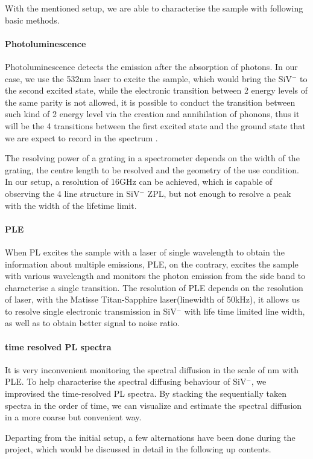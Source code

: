 With the mentioned setup, we are able to characterise the sample with following basic methods.


\paragraph{Photoluminescence} 
Photoluminescence detects the emission after the absorption of photons. In our case, we use the 532nm laser to excite the sample, which would bring the SiV$^{-}$ to the second excited state, while the electronic transition between 2 energy levels of the same parity is not allowed, it is possible to conduct the transition between such kind of 2 energy level via the creation and annihilation of phonons, thus it will be the 4 transitions between the first excited state and the ground state that we are expect to record in the spectrum .

The resolving power of a grating in a spectrometer depends on the width of the grating, the centre length to be resolved and the geometry of the use condition. In our setup, a resolution of 16GHz can be achieved, which is capable of observing the 4 line structure in SiV$^{-}$ ZPL, but not enough to resolve a peak with the width of the lifetime limit. 

\paragraph{PLE} When PL excites the sample with a laser of single wavelength to obtain the information about multiple emissions, PLE, on the contrary, excites the sample with various wavelength and monitors the photon emission from the side band to characterise a single transition. The resolution of PLE depends on the resolution of laser, with the Matisse Titan-Sapphire laser(linewidth of 50kHz), it allows us to resolve single electronic transmission in SiV$^{-}$ with life time limited line width, as well as to obtain better signal to noise ratio. 

\paragraph{time resolved PL spectra} It is very inconvenient monitoring the spectral diffusion in the scale of nm with PLE. To help characterise the spectral diffusing behaviour of SiV$^{-}$, we improvised the time-resolved PL spectra. By stacking the sequentially taken spectra in the order of time, we can visualize and estimate the spectral diffusion in a more coarse but convenient way. 
 
Departing from the initial setup, a few alternations have been done during the project, which would be discussed in detail in the following up contents.